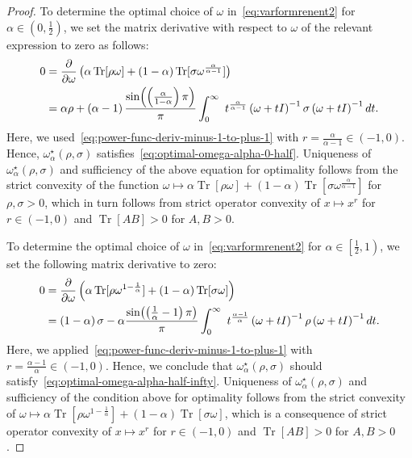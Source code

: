 \documentclass[10pt,a4paper]{amsart}
\DeclareMathOperator{\Tr}{Tr}
\begin{document}
\begin{proof}
To determine the optimal choice of $\omega$ in~\eqref{eq:varformrenent2} for $\alpha\in\left(0,\frac{1}{2}\right)$,
we set the  matrix derivative with respect to $\omega$ of the relevant expression to zero as follows:
\begin{align}
0&=  \frac{\partial}{\partial\omega}\left(\alpha\Tr[\rho\omega]+\left(1-\alpha\right)\Tr[\sigma\omega^{\frac{\alpha}{\alpha-1}}]\right) \nonumber \\
 &  =\alpha\rho+\left(\alpha-1\right)\frac{\sin\!\left(\left(\frac{\alpha}{1-\alpha}\right)\pi\right)}{\pi}\int_{0}^{\infty}\ t^{\frac{\alpha}{\alpha-1}}\left(\omega+tI\right)^{-1}\sigma\left(\omega+tI\right)^{-1}dt.\notag
\end{align}
Here, we used~\eqref{eq:power-func-deriv-minus-1-to-plus-1} with  $r=\frac{\alpha}{\alpha-1}\in\left(-1,0\right)$. Hence, $\omega_{\alpha}^{\star}(\rho,\sigma)$ satisfies~\eqref{eq:optimal-omega-alpha-0-half}.  Uniqueness of $\omega_{\alpha}^{\star}(\rho,\sigma)$ and sufficiency of the above equation for optimality follows from the strict convexity of the function $\omega\mapsto\alpha\Tr[\rho\omega]+\left(1-\alpha\right)\Tr[\sigma\omega^{\frac{\alpha}{\alpha-1}}]$
for $\rho,\sigma>0$, which in turn follows from strict operator convexity of $x \mapsto x^{r}$ for $r \in (-1,0)$ and $\Tr[AB]> 0$ for $A,B >0$.

To determine the optimal choice of $\omega$ in~\eqref{eq:varformrenent2} for $\alpha\in\left[\frac{1}{2},1\right)$, 
we set the following matrix derivative to zero:
\begin{align}
 0&= \frac{\partial}{\partial\omega}\left(\alpha\Tr[\rho\omega^{1-\frac{1}{\alpha}}]+\left(1-\alpha\right)\Tr[\sigma\omega]\right)\nonumber \\ 
  & =\left(1-\alpha\right)\sigma-\alpha\frac{\sin\!\left(\left(\frac{1}{\alpha}-1\right)\pi\right)}{\pi}\int_{0}^{\infty}\ t^{\frac{\alpha-1}{\alpha}}\left(\omega+tI\right)^{-1}\rho\left(\omega+tI\right)^{-1}dt. \notag 
\end{align}
Here, we applied~\eqref{eq:power-func-deriv-minus-1-to-plus-1} with $r=\frac{\alpha-1}{\alpha} \in (-1,0)$.
Hence, we conclude that $\omega_{\alpha}^{\star}(\rho,\sigma)$ should satisfy~\eqref{eq:optimal-omega-alpha-half-infty}. Uniqueness of $\omega_{\alpha}^{\star}(\rho,\sigma)$ and sufficiency of the condition above for optimality follows from the strict convexity of $\omega\mapsto\alpha\Tr[\rho\omega^{1-\frac{1}{\alpha}}]+\left(1-\alpha\right)\Tr[\sigma\omega]$, which is a consequence of strict operator convexity of $x \mapsto x^{r}$ for $r \in (-1,0)$ and $\Tr[AB]> 0$ for $A,B >0$.


\end{proof}
\end{document}
